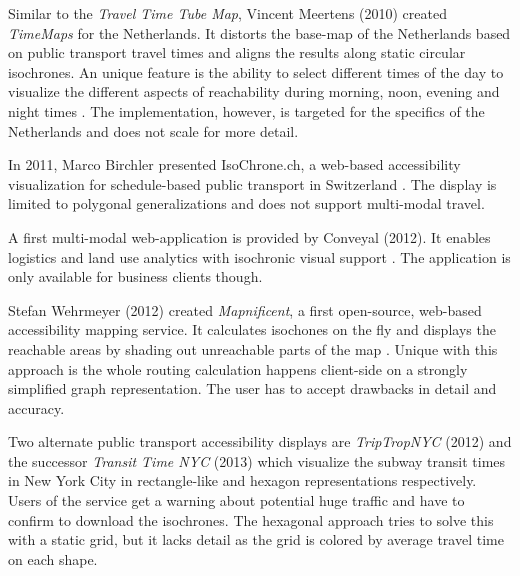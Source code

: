     Similar to the \textit{Travel Time Tube Map}, Vincent Meertens (2010)
    created \textit{TimeMaps} for the Netherlands. It distorts the base-map of
    the Netherlands based on public transport travel times and aligns the
    results along static circular isochrones. An unique feature is the ability
    to select different times of the day to visualize the different aspects of
    reachability during morning, noon, evening and night times
    \cite{TimeMaps,meertens2012}. The implementation, however, is targeted for
    the specifics of the Netherlands and does not scale for more detail.\par

    In 2011, Marco Birchler presented IsoChrone.ch, a web-based accessibility
    visualization for schedule-based public transport in Switzerland
    \cite{IsochroneCh,birchler2011computing}. The display is limited to
    polygonal generalizations and does not support multi-modal travel.\par

    A first multi-modal web-application is provided by Conveyal (2012). It
    enables logistics and land use analytics with isochronic visual
    support \cite{Conveyal}. The application is only available for business
    clients though.\par

    Stefan Wehrmeyer (2012) created \textit{Mapnificent}, a first open-source,
    web-based accessibility mapping service. It calculates isochones on the fly
    and displays the reachable areas by shading out unreachable parts of the
    map \cite{Mapnificent}. Unique with this approach is the whole routing
    calculation happens client-side on a strongly simplified graph
    representation. The user has to accept drawbacks in detail and accuracy.\par

    Two alternate public transport accessibility displays are
    \textit{TripTropNYC} (2012) \cite{TriptropNYC} and the successor
    \textit{Transit Time NYC} (2013) \cite{TransitTimeNYC} which visualize the
    subway transit times in New York City in rectangle-like and hexagon
    representations respectively. Users of the service get a warning about
    potential huge traffic and have to confirm to download the isochrones. The
    hexagonal approach tries to solve this with a static grid, but it lacks
    detail as the grid is colored by average travel time on each shape.\par

